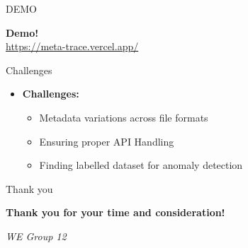 \documentclass{beamer}
\begin{document}
\begin{frame}{DEMO}
\begin{center}
        \textbf{Demo!}\\     
        \url{https://meta-trace.vercel.app/}\\ 
    \end{center}
    \vspace{1cm}
    
\end{frame}

\begin{frame}{Challenges}
    \begin{itemize}
        \item \textbf{Challenges:}
        \begin{itemize}
            \item Metadata variations across file formats
            \item Ensuring proper API Handling
            \item Finding labelled dataset for anomaly detection
            
        \end{itemize}
                
    \end{itemize}
\end{frame}

\begin{frame}{Thank you}
\begin{center}
        \textbf{Thank you for your time and consideration!}\\        
    \end{center}
    \vspace{1cm}
    \begin{flushright}
        \textit{WE Group 12}
    \end{flushright}
\end{frame}
\end{document}
